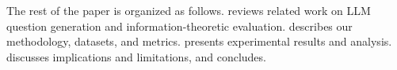The rest of the paper is organized as follows.  reviews related work on LLM question generation and information-theoretic evaluation.  describes our methodology, datasets, and metrics.  presents experimental results and analysis.  discusses implications and limitations, and  concludes.
